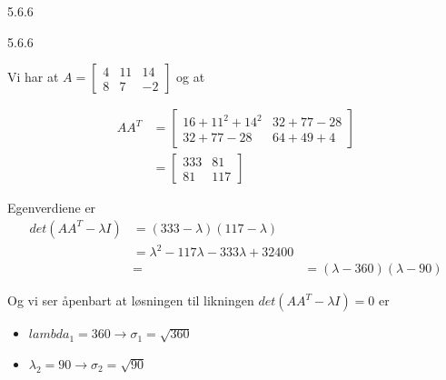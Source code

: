 \documentclass[a4paper,norsk]{article}
\begin{document}
\begin{oppgavebox}{5.6.6}{}
\begin{proofbox}{5.6.6}{}

Vi har at $ A = \begin{bmatrix}
    4&11&14\\
    8&7&-2
\end{bmatrix}  $ og at 

\begin{align*}
    AA^T &= \begin{bmatrix}
        16 + 11^2 + 14^2 & 32 + 77 - 28\\
        32 + 77 - 28 & 64 + 49 + 4
    \end{bmatrix} \\
    &= \begin{bmatrix}
        333 & 81\\
        81& 117
    \end{bmatrix} 
\end{align*}

Egenverdiene er
\begin{align*}
    det \left( AA^T - \lambda I \right) &= \left( 333- \lambda  \right) \left( 117 - \lambda  \right) \\
    &= \lambda^2 - 117 \lambda - 333 \lambda  + 32400 \\&=
    &= \left( \lambda - 360 \right) \left( \lambda  - 90 \right) 
\end{align*}

Og vi ser åpenbart at løsningen til likningen $ det \left( AA^T - \lambda I \right) = 0  $ er
\begin{itemize}
    \item $ lambda_1 = 360  \rightarrow \sigma_1 = \sqrt{ 360 }$
    \item $ \lambda _2 = 90 \rightarrow \sigma_2 = \sqrt{ 90 } $  
\end{itemize} 
\end{proofbox}

\end{oppgavebox}
\end{document}

